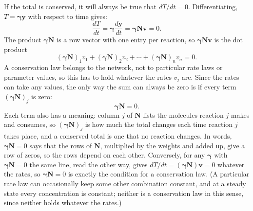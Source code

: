 \documentclass[11pt,a4paper,openany]{report}
\begin{document}
{{If the total is conserved, it will always be true that $dT/dt = 0$. Differentiating, $T = \boldsymbol{\gamma} \mathbf{y}$ with respect to time gives:
\[
  \frac{dT}{dt} = \boldsymbol{\gamma} \frac{d\mathbf{y}}{dt}
  = \boldsymbol{\gamma} \mathbf{N} \mathbf{v} = 0 .
\]
The product $\boldsymbol{\gamma} \mathbf{N}$ is a row vector with one entry
per reaction, so $\boldsymbol{\gamma} \mathbf{N} \mathbf{v}$ is the dot
product
\[
  (\boldsymbol{\gamma} \mathbf{N})_1 v_1 + (\boldsymbol{\gamma} \mathbf{N})_2
  v_2 + \cdots + (\boldsymbol{\gamma} \mathbf{N})_n v_n = 0 .
\]
A conservation law belongs to the network, not to particular rate laws or
parameter values, so this has to hold whatever the rates $v_j$ are. Since
the rates can take any values, the only way the sum can always be zero is
if every term $(\boldsymbol{\gamma} \mathbf{N})_j$ is zero:
\[
  \boldsymbol{\gamma} \mathbf{N} = 0 .
\]
Each term also has a meaning: column $j$ of $\mathbf{N}$ lists the molecules
reaction $j$ makes and consumes, so $(\boldsymbol{\gamma} \mathbf{N})_j$ is how
much the total changes each time reaction $j$ takes place, and a conserved
total is one that no reaction changes. In words, $\boldsymbol{\gamma}
\mathbf{N} = 0$ says that the rows of $\mathbf{N}$, multiplied by the
weights and added up, give a row of zeros, so the rows depend on each
other. Conversely, for any $\boldsymbol{\gamma}$ with $\boldsymbol{\gamma}
\mathbf{N} = 0$ the same line, read the other way, gives $dT/dt =
(\boldsymbol{\gamma} \mathbf{N}) \mathbf{v} = 0$ whatever the rates, so
$\boldsymbol{\gamma} \mathbf{N} = 0$ is exactly the condition for a
conservation law. (A particular rate law can occasionally keep some other
combination constant, and at a steady state every concentration is
constant; neither is a conservation law in this sense, since neither holds
whatever the rates.)

}}
\end{document}
